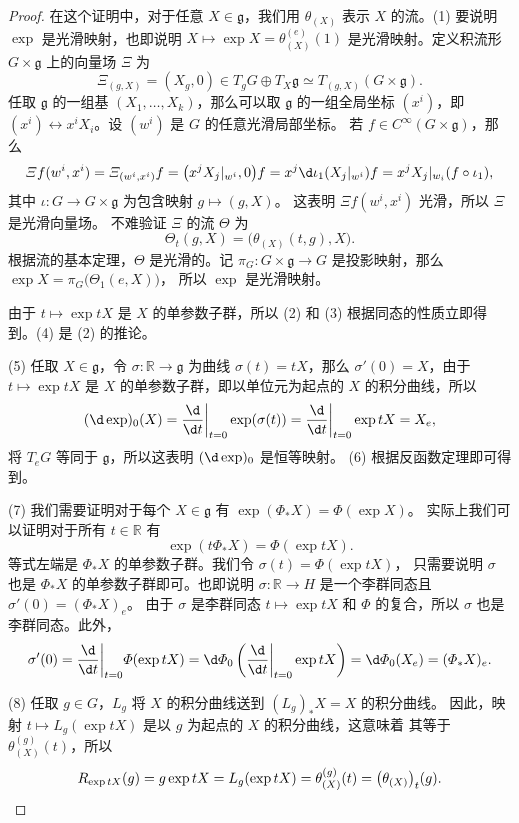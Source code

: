 \documentclass[fontset=none]{Notes}
\newcommand{\lie}[1]{\mathfrak{#1}}
\begin{document}
\begin{proof}
  在这个证明中，对于任意 $X\in\lie g$，我们用 $\theta_{(X)}$ 表示 $X$
  的流。(1) 要说明 $\exp$ 是光滑映射，也即说明 $X\mapsto \exp X=\theta_{(X)}^{(e)}(1)$
  是光滑映射。定义积流形 $G\times \lie g$ 上的向量场 $\varXi$ 为
  \[
    \varXi_{(g,X)}=(X_g,0)\in T_g G\oplus T_X\lie g
    \simeq T_{(g,X)}(G\times\lie g).  
  \]
  任取 $\lie g$ 的一组基 $(X_1,\dots,X_k)$，那么可以取 $\lie g$ 的一组全局坐标
  $(x^i)$，即 $(x^i)\leftrightarrow x^iX_i$。设 $(w^i)$ 是 $G$ 的任意光滑局部坐标。
  若 $f\in C^\infty(G\times\lie g)$，那么
  \[
    \varXi f(w^i,x^i)=\varXi_{(w^i,x^i)}f
    =\bigl(x^jX_j|_{w^i},0\bigr) f=x^j\d \iota_1(X_{j}|_{w^i})f
    =x^j X_j|_{w_i}(f\circ\iota_1),
  \]
  其中 $\iota:G\to G\times \lie g$ 为包含映射 $g\mapsto (g,X)$。
  这表明 $\varXi f(w^i,x^i)$ 光滑，所以 $\varXi$ 是光滑向量场。
  不难验证 $\varXi$ 的流 $\varTheta$ 为
  \[
    \varTheta_t(g,X)=\bigl(\theta_{(X)}(t,g),X\bigr)  .
  \]
  根据流的基本定理，$\varTheta$ 是光滑的。记 $\pi_G:G\times\lie g\to G$
  是投影映射，那么 $\exp X=\pi_G\bigl(\varTheta_1(e,X)\bigr)$，
  所以 $\exp$ 是光滑映射。

  由于 $t\mapsto \exp tX$ 是 $X$ 的单参数子群，所以 (2) 和 (3) 
  根据同态的性质立即得到。(4) 是 (2) 的推论。

  (5) 任取 $X\in\lie g$，令 $\sigma:\mathbb{R}\to\lie g$ 为曲线
  $\sigma(t)=tX$，那么 $\sigma'(0)=X$，由于 $t\mapsto \exp tX$
  是 $X$ 的单参数子群，即以单位元为起点的 $X$ 的积分曲线，所以
  \[
    (\d \exp)_0(X)=\frac{\d}{\d t}\bigg|_{t=0}\exp(\sigma(t))
    =\frac{\d}{\d t}\bigg|_{t=0}\exp tX=X_e,
  \]
  将 $T_eG$ 等同于 $\lie g$，所以这表明 $(\d \exp)_0$ 是恒等映射。
  (6) 根据反函数定理即可得到。
  
  (7) 我们需要证明对于每个 $X\in\lie g$ 有 $\exp(\varPhi_*X)=\varPhi(\exp X)$。
  实际上我们可以证明对于所有 $t\in \mathbb{R}$ 有
  \[
    \exp(t\varPhi_*X)=\varPhi(\exp tX).  
  \]
  等式左端是 $\varPhi_*X$ 的单参数子群。我们令 $\sigma(t)=\varPhi(\exp tX)$，
  只需要说明 $\sigma$ 也是 $\varPhi_*X$ 的单参数子群即可。也即说明
  $\sigma:\mathbb{R}\to H$ 是一个李群同态且 $\sigma'(0)=(\varPhi_*X)_e$。
  由于 $\sigma$ 是李群同态 $t\mapsto \exp tX$ 和 $\varPhi$ 的复合，所以
  $\sigma$ 也是李群同态。此外，
  \[
    \sigma'(0)=\frac{\d}{\d t}\bigg|_{t=0} \varPhi(\exp tX)
    =\d \varPhi_0\left(\frac{\d}{\d t}\bigg|_{t=0}\exp tX\right) 
    =\d\varPhi_0(X_e)=(\varPhi_*X)_e.
  \]

  (8) 任取 $g\in G$，$L_g$ 将 $X$ 的积分曲线送到 $(L_g)_*X=X$ 的积分曲线。
  因此，映射 $t\mapsto L_g(\exp tX)$ 是以 $g$ 为起点的 $X$ 的积分曲线，这意味着
  其等于 $\theta_{(X)}^{(g)}(t)$，所以 
  \[
    R_{\exp tX}(g)=g\exp tX=  L_g(\exp tX)=
    \theta_{(X)}^{(g)}(t)=\bigl(\theta_{(X)}\bigr)_t(g).\qedhere
  \]
\end{proof}
\end{document}
